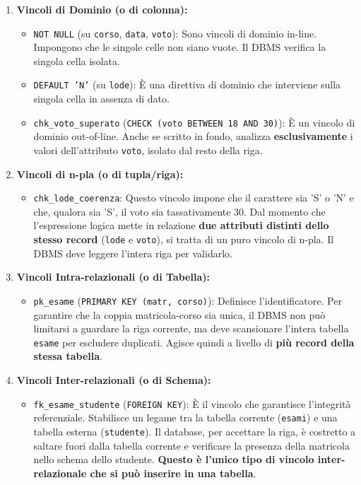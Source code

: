 \begin{example}
\begin{enumerate}
    \item \textbf{Vincoli di Dominio (o di colonna):}
    \begin{itemize}
        \item \texttt{NOT NULL} (su \texttt{corso}, \texttt{data}, \texttt{voto}): Sono vincoli di dominio in-line. Impongono che le singole celle non siano vuote. Il DBMS verifica la singola cella isolata.
        \item \texttt{DEFAULT 'N'} (su \texttt{lode}): È una direttiva di dominio che interviene sulla singola cella in assenza di dato.
        \item \texttt{chk\_voto\_superato} (\texttt{CHECK (voto BETWEEN 18 AND 30)}): È un vincolo di dominio out-of-line. Anche se scritto in fondo, analizza \textbf{esclusivamente} i valori dell'attributo \texttt{voto}, isolato dal resto della riga.
    \end{itemize}

    \item \textbf{Vincoli di n-pla (o di tupla/riga):}
    \begin{itemize}
        \item \texttt{chk\_lode\_coerenza}: Questo vincolo impone che il carattere sia 'S' o 'N' e che, qualora sia 'S', il voto sia tassativamente 30. Dal momento che l'espressione logica mette in relazione \textbf{due attributi distinti dello stesso record} (\texttt{lode} e \texttt{voto}), si tratta di un puro vincolo di n-pla. Il DBMS deve leggere l'intera riga per validarlo.
    \end{itemize}

    \item \textbf{Vincoli Intra-relazionali (o di Tabella):}
    \begin{itemize}
        \item \texttt{pk\_esame} (\texttt{PRIMARY KEY (matr, corso)}): Definisce l'identificatore. Per garantire che la coppia matricola-corso sia unica, il DBMS non può limitarsi a guardare la riga corrente, ma deve scansionare l'intera tabella \texttt{esame} per escludere duplicati. Agisce quindi a livello di \textbf{più record della stessa tabella}.
    \end{itemize}

    \item \textbf{Vincoli Inter-relazionali (o di Schema):}
    \begin{itemize}
        \item \texttt{fk\_esame\_studente} (\texttt{FOREIGN KEY}): È il vincolo che garantisce l'integrità referenziale. Stabilisce un legame tra la tabella corrente (\texttt{esami}) e una tabella esterna (\texttt{studente}). Il database, per accettare la riga, è costretto a saltare fuori dalla tabella corrente e verificare la presenza della matricola nello schema dello studente. \textbf{Questo è l'unico tipo di vincolo inter-relazionale che si può inserire in una tabella}.
    \end{itemize}
\end{enumerate}
\end{example}

